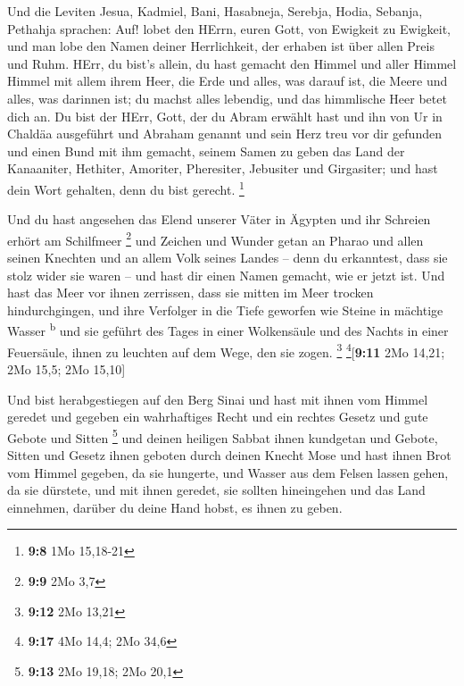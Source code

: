  Und die Leviten Jesua, Kadmiel, Bani, Hasabneja, Serebja,
Hodia, Sebanja, Pethahja sprachen: Auf! lobet den HErrn, euren Gott, von
Ewigkeit zu Ewigkeit, und man lobe den Namen deiner Herrlichkeit, der
erhaben ist über allen Preis und Ruhm.  HErr, du bist's
allein, du hast gemacht den Himmel und aller Himmel Himmel mit allem
ihrem Heer, die Erde und alles, was darauf ist, die Meere und alles, was
darinnen ist; du machst alles lebendig, und das himmlische Heer betet
dich an.  Du bist der HErr, Gott, der du Abram erwählt
hast und ihn von Ur in Chaldäa ausgeführt und Abraham genannt
 und sein Herz treu vor dir gefunden und einen Bund mit
ihm gemacht, seinem Samen zu geben das Land der Kanaaniter, Hethiter,
Amoriter, Pheresiter, Jebusiter und Girgasiter; und hast dein Wort
gehalten, denn du bist gerecht. \footnote{\textbf{9:8} 1Mo 15,18-21}

 Und du hast angesehen das Elend unserer Väter in Ägypten
und ihr Schreien erhört am Schilfmeer \footnote{\textbf{9:9} 2Mo 3,7}
 und Zeichen und Wunder getan an Pharao und allen seinen
Knechten und an allem Volk seines Landes -- denn du erkanntest, dass sie
stolz wider sie waren -- und hast dir einen Namen gemacht, wie er jetzt
ist.  Und hast das Meer vor ihnen zerrissen, dass sie
mitten im Meer trocken hindurchgingen, und ihre Verfolger in die Tiefe
geworfen wie Steine in mächtige Wasser \textsuperscript{b}
 und sie geführt des Tages in einer Wolkensäule und des
Nachts in einer Feuersäule, ihnen zu leuchten auf dem Wege, den sie
zogen. \footnote{\textbf{9:12} 2Mo 13,21} \footnote{\textbf{9:17} 4Mo
  14,4; 2Mo 34,6}{[}\textbf{9:11} 2Mo 14,21; 2Mo 15,5; 2Mo 15,10{]}

 Und bist herabgestiegen auf den Berg Sinai und hast mit
ihnen vom Himmel geredet und gegeben ein wahrhaftiges Recht und ein
rechtes Gesetz und gute Gebote und Sitten \footnote{\textbf{9:13} 2Mo
  19,18; 2Mo 20,1}  und deinen heiligen Sabbat ihnen
kundgetan und Gebote, Sitten und Gesetz ihnen geboten durch deinen
Knecht Mose  und hast ihnen Brot vom Himmel gegeben, da
sie hungerte, und Wasser aus dem Felsen lassen gehen, da sie dürstete,
und mit ihnen geredet, sie sollten hineingehen und das Land einnehmen,
darüber du deine Hand hobst, es ihnen zu geben.

